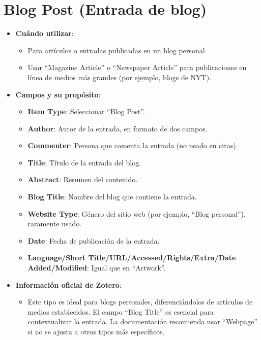 \documentclass[
  jou,
  floatsintext,
  longtable,
  a4paper,
  nolmodern,
  notxfonts,
  notimes,
  12pt,
  colorlinks=true,linkcolor=blue,citecolor=blue,urlcolor=blue]{apa7}
\providecommand{\tightlist}{%
  \setlength{\itemsep}{0pt}\setlength{\parskip}{0pt}}
\begin{document}
\section{Blog Post (Entrada de blog)}\label{blog-post-entrada-de-blog}

\begin{itemize}
\tightlist
\item
  \textbf{Cuándo utilizar}:

  \begin{itemize}
  \tightlist
  \item
    Para artículos o entradas publicadas en un blog personal.
  \item
    Usar ``Magazine Article'' o ``Newspaper Article'' para publicaciones
    en línea de medios más grandes (por ejemplo, blogs de NYT).
  \end{itemize}
\item
  \textbf{Campos y su propósito}:

  \begin{itemize}
  \tightlist
  \item
    \textbf{Item Type}: Seleccionar ``Blog Post''.
  \item
    \textbf{Author}: Autor de la entrada, en formato de dos campos.
  \item
    \textbf{Commenter}: Persona que comenta la entrada (no usado en
    citas).
  \item
    \textbf{Title}: Título de la entrada del blog.
  \item
    \textbf{Abstract}: Resumen del contenido.
  \item
    \textbf{Blog Title}: Nombre del blog que contiene la entrada.
  \item
    \textbf{Website Type}: Género del sitio web (por ejemplo, ``Blog
    personal''), raramente usado.
  \item
    \textbf{Date}: Fecha de publicación de la entrada.
  \item
    \textbf{Language/Short Title/URL/Accessed/Rights/Extra/Date
    Added/Modified}: Igual que en ``Artwork''.
  \end{itemize}
\item
  \textbf{Información oficial de Zotero}:

  \begin{itemize}
  \tightlist
  \item
    Este tipo es ideal para blogs personales, diferenciándolos de
    artículos de medios establecidos. El campo ``Blog Title'' es
    esencial para contextualizar la entrada. La documentación recomienda
    usar ``Webpage'' si no se ajusta a otros tipos más específicos.
  \end{itemize}
\end{itemize}
\end{document}
